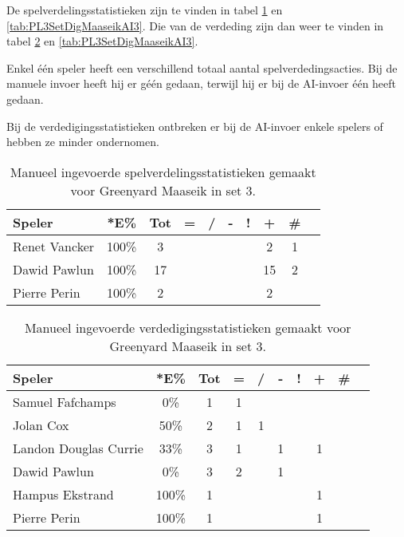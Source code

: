 De spelverdelingsstatistieken zijn te vinden in tabel \ref{tab:PL3SetMaaseikMan3} en \ref{tab:PL3SetDigMaaseikAI3}. Die van de verdeding zijn dan weer te vinden in tabel \ref{tab:PL3DigMaaseikMan3} en \ref{tab:PL3SetDigMaaseikAI3}. 

Enkel één speler heeft een verschillend totaal aantal spelverdedingsacties. Bij de manuele invoer heeft hij er géén gedaan, terwijl hij er bij de AI-invoer één heeft gedaan. 

Bij de verdedigingsstatistieken ontbreken er bij de AI-invoer enkele spelers of hebben ze minder ondernomen. 

\begin{table}[ht!]
    \centering
    \scriptsize
    \begin{tabular}{|l|c|c|c|c|c|c|c|c|c|} \hline
        \textbf{Speler} & *E\% & Tot & = & / & - & ! & + & \#\\ \hline
        Renet Vancker & 100\% & 3 &  &  &  &  & 2 & 1 \\ 
        Dawid Pawlun & 100\% & 17 &  &  &  &  & 15 & 2 \\ 
        Pierre Perin & 100\% & 2 &  &  &  &  & 2 &  \\ \hline
    \end{tabular}
    \caption[Manueel ingevoerde spelverdelingsstatistieken gemaakt voor Greenyard Maaseik in set 3]{\label{tab:PL3SetMaaseikMan3}Manueel ingevoerde spelverdelingsstatistieken gemaakt voor Greenyard Maaseik in set 3.}
\end{table}

\begin{table}[ht!]
    \centering
    \scriptsize
    \begin{tabular}{|l|c|c|c|c|c|c|c|c|c|} \hline
        \textbf{Speler} & *E\% & Tot & = & / & - & ! & + & \#\\ \hline
        Samuel Fafchamps & 0\% & 1 & 1 &  &  &  &  &  \\ 
        Jolan Cox & 50\% & 2 & 1 & 1 &  &  &  & \\
        Landon Douglas Currie & 33\% & 3 & 1 &  & 1 &  & 1 &  \\
        Dawid Pawlun & 0\% & 3 & 2 &  & 1 &  &  &  \\ 
        Hampus Ekstrand & 100\% & 1 &  &  &  &  & 1 &\\ 
        Pierre Perin & 100\% & 1 &  &  &  &  & 1 & \\ \hline
    \end{tabular}
    \caption[Manueel ingevoerde verdedigingsstatistieken gemaakt voor Greenyard Maaseik in set 3]{\label{tab:PL3DigMaaseikMan3}Manueel ingevoerde verdedigingsstatistieken gemaakt voor Greenyard Maaseik in set 3.}
\end{table}

